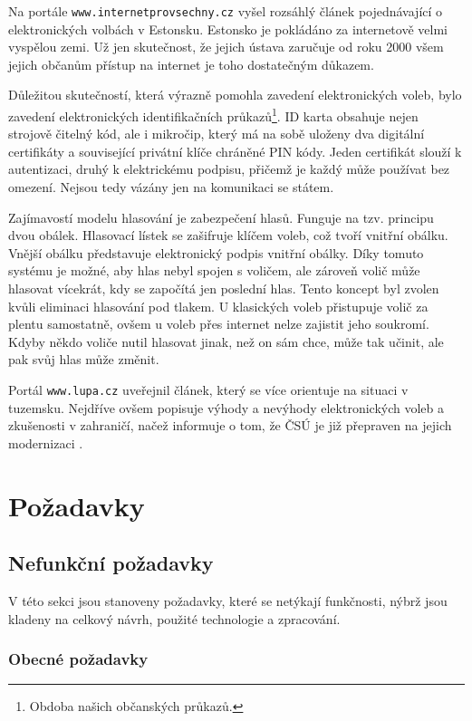 \documentclass[11pt,twoside,a4paper]{book}
\begin{document}
Na portále \texttt{www.internetprovsechny.cz} vyšel rozsáhlý článek \cite{www:estonsko} pojednávající o elektronických volbách v Estonsku. Estonsko je pokládáno za internetově velmi vyspělou zemi. Už jen skutečnost, že jejich ústava zaručuje od roku 2000 všem jejich občanům přístup na internet je toho dostatečným důkazem.

Důležitou skutečností, která výrazně pomohla zavedení elektronických voleb, bylo zavedení elektronických identifikačních průkazů\footnote{Obdoba našich občanských průkazů.}. ID karta obsahuje nejen strojově čitelný kód, ale i mikročip, který má na sobě uloženy dva digitální certifikáty a související privátní klíče chráněné PIN kódy. Jeden certifikát slouží k autentizaci, druhý k elektrickému podpisu, přičemž je každý může používat bez omezení. Nejsou tedy vázány jen na komunikaci se státem.

Zajímavostí modelu hlasování je zabezpečení hlasů. Funguje na tzv. principu dvou obálek. Hlasovací lístek se zašifruje klíčem voleb, což tvoří vnitřní obálku. Vnější obálku představuje elektronický podpis vnitřní obálky. Díky tomuto systému je možné, aby hlas nebyl spojen s voličem, ale zároveň volič může hlasovat vícekrát, kdy se započítá jen poslední hlas. Tento koncept byl zvolen kvůli eliminaci hlasování pod tlakem. U klasických voleb přistupuje volič za plentu samostatně, ovšem u voleb přes internet nelze zajistit jeho soukromí. Kdyby někdo voliče nutil hlasovat jinak, než on sám chce, může tak učinit, ale pak svůj hlas může změnit.

Portál \texttt{www.lupa.cz} \cite{www:lupa} uveřejnil článek, který se více orientuje na situaci v tuzemsku. Nejdříve ovšem popisuje výhody a nevýhody elektronických voleb a zkušenosti v zahraničí, načež informuje o tom, že ČSÚ je již přepraven na jejich modernizaci \cite{www:csu}. 

\section{Požadavky}

\subsection{Nefunkční požadavky}

V této sekci jsou stanoveny požadavky, které se netýkají funkčnosti, nýbrž jsou kladeny na celkový návrh, použité technologie a zpracování.

\subsubsection{Obecné požadavky} \label{sec:obecne_pozadavky}
\end{document}

